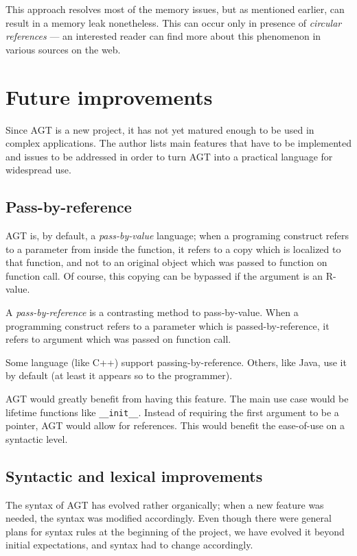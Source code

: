 \documentclass[times, utf8, diplomski]{fer}
\theoremstyle{definition}
\begin{document}
This approach resolves most of the memory issues, but as mentioned earlier, can result
in a memory leak nonetheless. This can occur only in presence of \textit{circular references} ---
an interested reader can find more about this phenomenon in various sources on the web.


\chapter{Future improvements}\label{chap:improv}

Since AGT is a new project, it has not yet matured enough to be used in complex applications.
The author lists main features that have to be implemented and issues to be addressed
in order to turn AGT into a practical language for widespread use.

\section{Pass-by-reference}

AGT is, by default, a \textit{pass-by-value} language; when a programing construct 
refers to a parameter from inside the function, it refers to a copy which is localized to that function,
and not to an original object which was passed to function on function call.
Of course, this copying can be bypassed if the argument is an R-value.

A \textit{pass-by-reference} is a contrasting method to pass-by-value. When a programming construct 
refers to a parameter which is passed-by-reference, it refers to argument which was passed on
function call.

Some language (like C++) support passing-by-reference. Others, like Java, use it by default 
(at least it appears so to the programmer).

AGT would greatly benefit from having this feature. The main use case would be
lifetime functions like \texttt{\_\_init\_\_}. Instead of requiring the first argument to be a pointer,
AGT would allow for references. This would benefit the ease-of-use on a syntactic level.

\section{Syntactic and lexical improvements}

The syntax of AGT has evolved rather organically; when a new feature was needed,
the syntax was modified accordingly. Even though there were general plans for syntax rules
at the beginning of the project, we have evolved it beyond initial expectations,
and syntax had to change accordingly.
\end{document}
